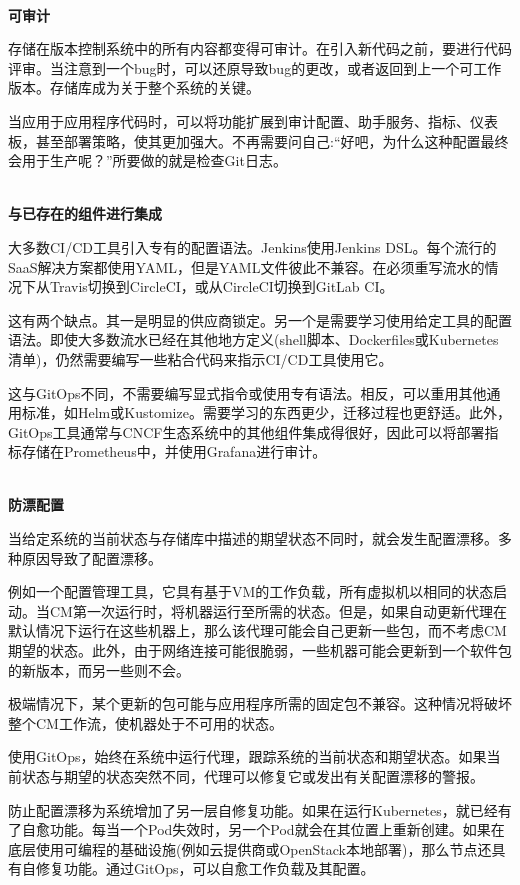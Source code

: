 \hspace*{\fill} \\ %
\noindent
\textbf{可审计}

存储在版本控制系统中的所有内容都变得可审计。在引入新代码之前，要进行代码评审。当注意到一个bug时，可以还原导致bug的更改，或者返回到上一个可工作版本。存储库成为关于整个系统的关键。

当应用于应用程序代码时，可以将功能扩展到审计配置、助手服务、指标、仪表板，甚至部署策略，使其更加强大。不再需要问自己:“好吧，为什么这种配置最终会用于生产呢？”所要做的就是检查Git日志。

\hspace*{\fill} \\ %
\noindent
\textbf{与已存在的组件进行集成}

大多数CI/CD工具引入专有的配置语法。Jenkins使用Jenkins DSL。每个流行的SaaS解决方案都使用YAML，但是YAML文件彼此不兼容。在必须重写流水的情况下从Travis切换到CircleCI，或从CircleCI切换到GitLab CI。

这有两个缺点。其一是明显的供应商锁定。另一个是需要学习使用给定工具的配置语法。即使大多数流水已经在其他地方定义(shell脚本、Dockerfiles或Kubernetes清单)，仍然需要编写一些粘合代码来指示CI/CD工具使用它。

这与GitOps不同，不需要编写显式指令或使用专有语法。相反，可以重用其他通用标准，如Helm或Kustomize。需要学习的东西更少，迁移过程也更舒适。此外，GitOps工具通常与CNCF生态系统中的其他组件集成得很好，因此可以将部署指标存储在Prometheus中，并使用Grafana进行审计。

\hspace*{\fill} \\ %
\noindent
\textbf{防漂配置}

当给定系统的当前状态与存储库中描述的期望状态不同时，就会发生配置漂移。多种原因导致了配置漂移。

例如一个配置管理工具，它具有基于VM的工作负载，所有虚拟机以相同的状态启动。当CM第一次运行时，将机器运行至所需的状态。但是，如果自动更新代理在默认情况下运行在这些机器上，那么该代理可能会自己更新一些包，而不考虑CM期望的状态。此外，由于网络连接可能很脆弱，一些机器可能会更新到一个软件包的新版本，而另一些则不会。

极端情况下，某个更新的包可能与应用程序所需的固定包不兼容。这种情况将破坏整个CM工作流，使机器处于不可用的状态。

使用GitOps，始终在系统中运行代理，跟踪系统的当前状态和期望状态。如果当前状态与期望的状态突然不同，代理可以修复它或发出有关配置漂移的警报。

防止配置漂移为系统增加了另一层自修复功能。如果在运行Kubernetes，就已经有了自愈功能。每当一个Pod失效时，另一个Pod就会在其位置上重新创建。如果在底层使用可编程的基础设施(例如云提供商或OpenStack本地部署)，那么节点还具有自修复功能。通过GitOps，可以自愈工作负载及其配置。

